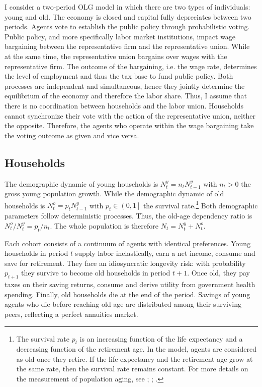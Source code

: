 

I consider a two-period OLG model in which there are two types of individuals: young and old. The economy is closed and capital fully depreciates between two periods.
Agents vote to establish the public policy through probabilistic voting. Public policy, and more specifically labor market institutions, impact wage bargaining between the representative firm and the representative union.
While at the same time, the representative union bargains over wages with the representative firm. The outcome of the bargaining, i.e. the wage rate, determines the level of employment and thus the tax base to fund public policy.
Both processes are independent and simultaneous, hence they jointly determine the equilibrium of the economy and therefore the labor share.
Thus, I assume that there is no coordination between households and the labor union. Households cannot synchronize their vote with the action of the representative union, neither the opposite. Therefore, the agents who operate within the wage bargaining take the voting outcome as given and vice versa. %

\subsection{Households}\label{subsec:households}

The demographic dynamic of young households is $N^y_t = n_t N^y_{t-1}$ with $n_t > 0$ the gross young population growth. While the demographic dynamic of old households is $N^o_t = p_t N^y_{t-1}$ with $p_t \in \left(0,1\right]$ the survival rate.\footnote{The survival rate $p_t$ is an increasing function of the life expectancy and a decreasing function of the retirement age. In the model, agents are considered as old once they retire. If the life expectancy and the retirement age grow at the same rate, then the survival rate remains constant. For more details on the measurement of population aging, see \cite{Sanderson2007}; \cite{Sanderson2013}; \cite{DAlbis2013}.} Both demographic parameters follow deterministic processes. Thus, the old-age dependency ratio is $N^o_t/N^y_t = p_t/n_t$. The whole population is therefore $N_t = N^y_t + N^o_t$.

Each cohort consists of a continuum of agents with identical preferences. Young households in period $t$ supply labor inelastically, earn a net income, consume and save for retirement. They face an idiosyncratic longevity risk: with probability $p_{t+1}$ they survive to become old households in period $t+1$. Once old, they pay taxes on their saving returns, consume and derive utility from government health spending. Finally, old households die at the end of the period. Savings of young agents who die before reaching old age are distributed among their surviving peers, reflecting a perfect annuities market.

